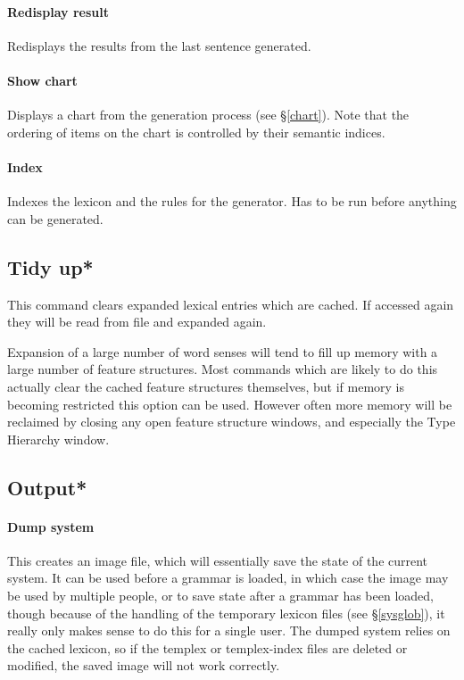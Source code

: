 \documentclass[12pt]{report}
\begin{document}
\paragraph{Redisplay result}
Redisplays the results from the last sentence generated.

\paragraph{Show chart}
Displays a chart from the generation process (see \S\ref{chart}).  Note that 
the ordering of items on the chart is controlled by their semantic
indices.  

\paragraph{Index}
Indexes the lexicon and the rules for the generator.  Has to
be run before anything can be generated.

\subsection{Tidy up*}
\label{tidy}
This command clears expanded lexical entries which are cached.  
If accessed again they will be read
from file and expanded again.

Expansion of a large number of word senses will tend to fill up memory
with a large number of feature structures.  Most commands which are
likely to do this actually clear the cached feature structures
themselves, but if memory is becoming restricted this option can be
used.  However often more memory will be reclaimed by closing any open
feature structure windows, and especially the Type Hierarchy window.

\subsection{Output*}

\paragraph{Dump system}
\label{dumplkb}
This creates an image file, which will essentially save the state of
the current system.  It can be used before a grammar is loaded, in which
case the image may be used by multiple people, or to save state after a 
grammar has been loaded, though because of the handling of the temporary 
lexicon files (see \S\ref{sysglob}), it really only makes sense to do this 
for a single user.  
The dumped system 
relies on the cached lexicon, so if the templex
or templex-index files are deleted or modified, the saved image will
not work correctly.
\end{document}
